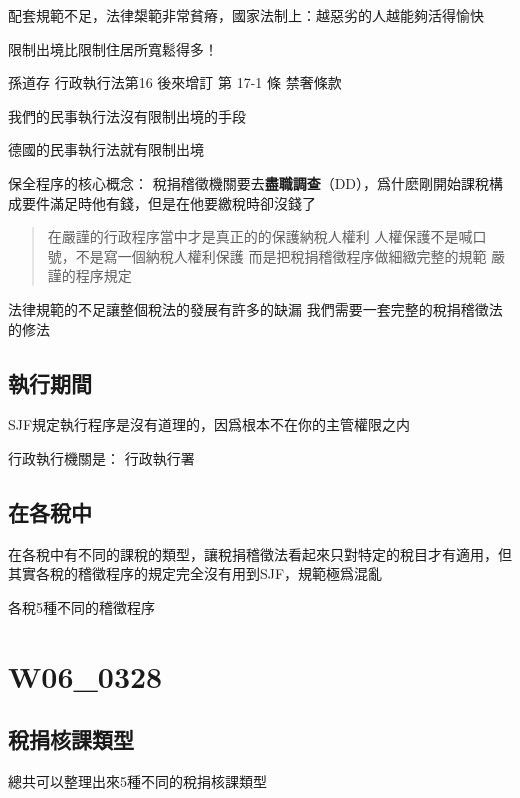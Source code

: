 \documentclass[]{ctexbook}
\begin{document}
配套規範不足，法律槼範非常貧瘠，國家法制上：越惡劣的人越能夠活得愉快

限制出境比限制住居所寬鬆得多！

孫道存
行政執行法第16
後來增訂
第 17-1 條 禁奢條款

我們的民事執行法沒有限制出境的手段

德國的民事執行法就有限制出境

保全程序的核心概念：
稅捐稽徵機關要去\textbf{盡職調查}（DD），爲什麽剛開始課稅構成要件滿足時他有錢，但是在他要繳稅時卻沒錢了

\begin{quote}
在嚴謹的行政程序當中才是真正的的保護納稅人權利
人權保護不是喊口號，不是寫一個納稅人權利保護
而是把稅捐稽徵程序做細緻完整的規範
嚴謹的程序規定
\end{quote}

法律規範的不足讓整個稅法的發展有許多的缺漏
我們需要一套完整的稅捐稽徵法的修法

\hypertarget{ux57f7ux884cux671fux9593}{%
\section{執行期間}\label{ux57f7ux884cux671fux9593}}

SJF規定執行程序是沒有道理的，因爲根本不在你的主管權限之内

行政執行機關是：
行政執行署

\hypertarget{ux5728ux5404ux7a05ux4e2d}{%
\section{在各稅中}\label{ux5728ux5404ux7a05ux4e2d}}

在各稅中有不同的課稅的類型，讓稅捐稽徵法看起來只對特定的稅目才有適用，但其實各稅的稽徵程序的規定完全沒有用到SJF，規範極爲混亂

各稅5種不同的稽徵程序

\hypertarget{w06_0328}{%
\chapter{W06\_0328}\label{w06_0328}}

\hypertarget{ux7a05ux6350ux6838ux8ab2ux985eux578b}{%
\section{稅捐核課類型}\label{ux7a05ux6350ux6838ux8ab2ux985eux578b}}

總共可以整理出來5種不同的稅捐核課類型
\end{document}
